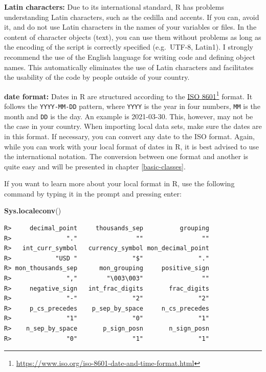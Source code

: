 \documentclass[
  12pt,
]{book}
\newenvironment{Shaded}{\begin{snugshade}}{\end{snugshade}}
\newcommand{\KeywordTok}[1]{\textcolor[rgb]{0.27,0.27,0.27}{\textbf{#1}}}
\newcommand{\NormalTok}[1]{#1}
\begin{document}
\textbf{Latin characters:} Due to its international standard, R has problems understanding Latin characters, such as the cedilla and accents. If you can, avoid it, and do not use Latin characters in the names of your variables or files. In the content of character objects (text), you can use them without problems as long as the encoding of the script is correctly specified (e.g.~UTF-8, Latin1). I strongly recommend the use of the English language for writing code and defining object names. This automatically eliminates the use of Latin characters and facilitates the usability of the code by people outside of your country.   

\textbf{date format:} Dates in R are structured according to the \href{https://www.iso.org/iso-8601-date-and-time-format.html}{ISO 8601}\footnote{\url{https://www.iso.org/iso-8601-date-and-time-format.html}} format. It follows the \texttt{YYYY-MM-DD} pattern, where \texttt{YYYY} is the year in four numbers, \texttt{MM} is the month and \texttt{DD} is the day. An example is 2021-03-30. This, however, may not be the case in your country. When importing local data sets, make sure the dates are in this format. If necessary, you can convert any date to the ISO format. Again, while you can work with your local format of dates in R, it is best advised to use the international notation. The conversion between one format and another is quite easy and will be presented in chapter \ref{basic-classes}. 

If you want to learn more about your local format in R, use the following command by typing it in the prompt and pressing enter:

\begin{Shaded}
\begin{Highlighting}[]
\KeywordTok{Sys.localeconv}\NormalTok{()}
\end{Highlighting}
\end{Shaded}

\begin{verbatim}
R>     decimal_point     thousands_sep          grouping 
R>               "."                ""                "" 
R>   int_curr_symbol   currency_symbol mon_decimal_point 
R>            "USD "               "$"               "." 
R> mon_thousands_sep      mon_grouping     positive_sign 
R>               ","        "\003\003"                "" 
R>     negative_sign   int_frac_digits       frac_digits 
R>               "-"               "2"               "2" 
R>     p_cs_precedes    p_sep_by_space     n_cs_precedes 
R>               "1"               "0"               "1" 
R>    n_sep_by_space       p_sign_posn       n_sign_posn 
R>               "0"               "1"               "1"
\end{verbatim}
\end{document}
